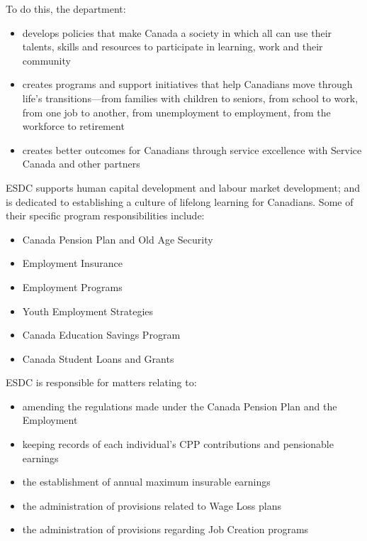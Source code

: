 \documentclass[letterpaper,10pt,english]{sphinxmanual}
\begin{document}
\sphinxAtStartPar
To do this, the department:
\begin{itemize}
\item {} 
\sphinxAtStartPar
develops policies that make Canada a society in which all can use their talents, skills and resources to participate in learning, work and their community

\item {} 
\sphinxAtStartPar
creates programs and support initiatives that help Canadians move through life’s transitions—from families with children to seniors, from school to work, from one job to another, from unemployment to employment, from the workforce to retirement

\item {} 
\sphinxAtStartPar
creates better outcomes for Canadians through service excellence with Service Canada and other partners

\end{itemize}

\sphinxAtStartPar
ESDC supports human capital development and labour market development; and is dedicated
to establishing a culture of lifelong learning for Canadians. Some of their specific program
responsibilities include:
\begin{itemize}
\item {} 
\sphinxAtStartPar
Canada Pension Plan and Old Age Security

\item {} 
\sphinxAtStartPar
Employment Insurance

\item {} 
\sphinxAtStartPar
Employment Programs

\item {} 
\sphinxAtStartPar
Youth Employment Strategies

\item {} 
\sphinxAtStartPar
Canada Education Savings Program

\item {} 
\sphinxAtStartPar
Canada Student Loans and Grants

\end{itemize}

\sphinxAtStartPar
ESDC is responsible for matters relating to:
\begin{itemize}
\item {} 
\sphinxAtStartPar
amending the regulations made under the Canada Pension Plan and the Employment 

\item {} 
\sphinxAtStartPar
keeping records of each individual’s CPP contributions and pensionable earnings

\item {} 
\sphinxAtStartPar
the establishment of annual maximum insurable earnings

\item {} 
\sphinxAtStartPar
the administration of provisions related to Wage Loss plans

\item {} 
\sphinxAtStartPar
the administration of provisions regarding Job Creation programs

\end{itemize}
\end{document}

